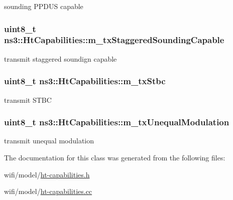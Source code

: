 sounding P\+P\+D\+US capable 

\subsubsection[{\texorpdfstring{m\+\_\+tx\+Staggered\+Sounding\+Capable}{m_txStaggeredSoundingCapable}}]{\setlength{\rightskip}{0pt plus 5cm}uint8\+\_\+t ns3\+::\+Ht\+Capabilities\+::m\+\_\+tx\+Staggered\+Sounding\+Capable\hspace{0.3cm}{\ttfamily [private]}}\hypertarget{classns3_1_1HtCapabilities_a56b848fe6b83dd90cce1bc79ab9a85a6}{}\label{classns3_1_1HtCapabilities_a56b848fe6b83dd90cce1bc79ab9a85a6}


transmit staggered soundign capable 

\subsubsection[{\texorpdfstring{m\+\_\+tx\+Stbc}{m_txStbc}}]{\setlength{\rightskip}{0pt plus 5cm}uint8\+\_\+t ns3\+::\+Ht\+Capabilities\+::m\+\_\+tx\+Stbc\hspace{0.3cm}{\ttfamily [private]}}\hypertarget{classns3_1_1HtCapabilities_ac17341a9c1ea2d18e6d056d3be310d96}{}\label{classns3_1_1HtCapabilities_ac17341a9c1ea2d18e6d056d3be310d96}


transmit S\+T\+BC 

\subsubsection[{\texorpdfstring{m\+\_\+tx\+Unequal\+Modulation}{m_txUnequalModulation}}]{\setlength{\rightskip}{0pt plus 5cm}uint8\+\_\+t ns3\+::\+Ht\+Capabilities\+::m\+\_\+tx\+Unequal\+Modulation\hspace{0.3cm}{\ttfamily [private]}}\hypertarget{classns3_1_1HtCapabilities_a867b8deccdd5103df2f88fd019ea1876}{}\label{classns3_1_1HtCapabilities_a867b8deccdd5103df2f88fd019ea1876}


transmit unequal modulation 



The documentation for this class was generated from the following files\+:\begin{DoxyCompactItemize}
\item 
wifi/model/\hyperlink{ht-capabilities_8h}{ht-\/capabilities.\+h}\item 
wifi/model/\hyperlink{ht-capabilities_8cc}{ht-\/capabilities.\+cc}\end{DoxyCompactItemize}
